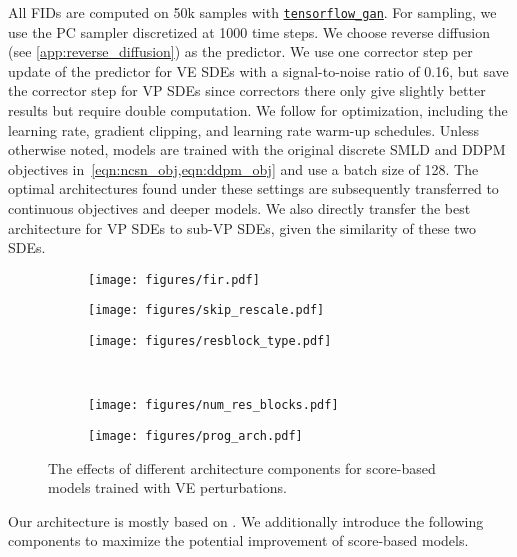 \documentclass{article} \usepackage{iclr2021_conference,times}
\begin{document}
All FIDs are computed on 50k samples with \href{https://github.com/tensorflow/gan}{\texttt{tensorflow\_gan}}. For sampling, we use the PC sampler discretized at 1000 time steps. We choose reverse diffusion (see \cref{app:reverse_diffusion}) as the predictor. We use one corrector step per update of the predictor for VE SDEs with a signal-to-noise ratio of 0.16, but save the corrector step for VP SDEs since correctors there only give slightly better results but require double computation. We follow \citet{ho2020denoising} for optimization, including the learning rate, gradient clipping, and learning rate warm-up schedules. Unless otherwise noted, models are trained with the original discrete SMLD and DDPM objectives in~\cref{eqn:ncsn_obj,eqn:ddpm_obj} and use a batch size of 128. The optimal architectures found under these settings are subsequently transferred to continuous objectives and deeper models. We also directly transfer the best architecture for VP SDEs to sub-VP SDEs, given the similarity of these two SDEs.
\begin{figure}[H]
    \centering
    \begin{subfigure}{0.32\textwidth}
        \texttt{[image: figures/fir.pdf]}
    \end{subfigure}
    \begin{subfigure}{0.32\textwidth}
        \texttt{[image: figures/skip\_rescale.pdf]}
    \end{subfigure}
    \begin{subfigure}{0.32\textwidth}
        \texttt{[image: figures/resblock\_type.pdf]}
    \end{subfigure}\\
    \begin{subfigure}{0.32\textwidth}
        \texttt{[image: figures/num\_res\_blocks.pdf]}
    \end{subfigure}
    \begin{subfigure}{0.58\textwidth}
        \texttt{[image: figures/prog\_arch.pdf]}
    \end{subfigure}
    \caption{The effects of different architecture components for score-based models trained with VE perturbations.}
    \label{fig:arch_search}
\end{figure}
Our architecture is mostly based on \citet{ho2020denoising}. We additionally introduce the following components to maximize the potential improvement of score-based models.
\end{document}
